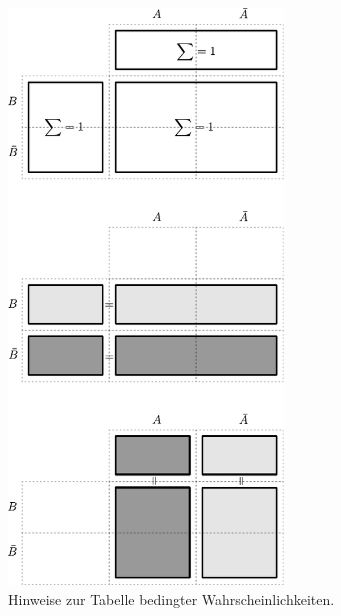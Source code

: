 \newpage
\begin{figure}[h!]
	\centering
	\includegraphics[width=0.65\textwidth]{bedingte-wahrscheinlichkeit-tipps.pdf}
	\caption{Hinweise zur Tabelle bedingter Wahrscheinlichkeiten.}
\end{figure}

